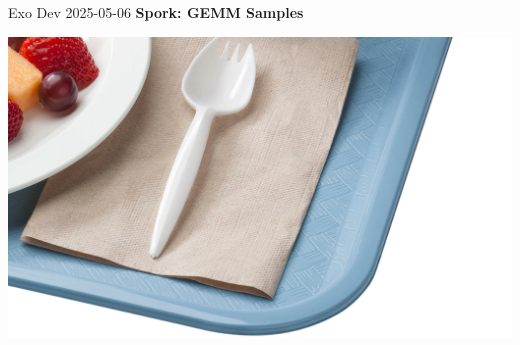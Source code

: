 { \LARGE Exo Dev 2025-05-06 } \hfill { \LARGE \textbf{\textsf{Spork: GEMM Samples}}}

\includegraphics[width=\linewidth]{usda_spork.jpg}

\newpage
{}


\newpage
{}



\newpage
{}



\newpage
{}



